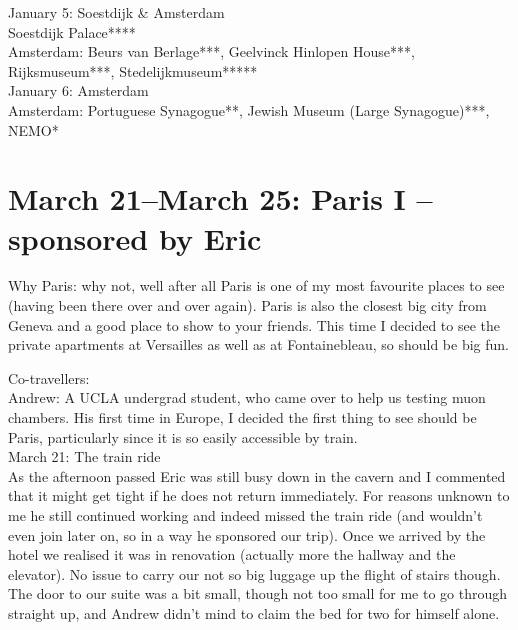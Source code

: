 January 5: Soestdijk \& Amsterdam\\
Soestdijk Palace****\\
Amsterdam: Beurs van Berlage***, Geelvinck Hinlopen House***, Rijksmuseum***, Stedelijkmuseum*****\\

January 6: Amsterdam\\
Amsterdam: Portuguese Synagogue**, Jewish Museum (Large Synagogue)***, NEMO*

\section{March 21--March 25: Paris I -- sponsored by Eric}
\label{2013:ParisI}

Why Paris: why not, well after all Paris is one of my most favourite places to see (having been there over and over again). Paris is also the closest big city from Geneva and a good place to show to your friends. This time I decided to see the private apartments at Versailles as well as at Fontainebleau, so should be big fun. 

Co-travellers:\\
Andrew: A UCLA undergrad student, who came over to help us testing muon chambers. His first time in Europe, I decided the first thing to see should be Paris, particularly since it is so easily accessible by train.\\

March 21: The train ride\\
As the afternoon passed Eric was still busy down in the cavern and I commented that it might get tight if he does not return immediately. For reasons unknown to me he still continued working and indeed missed the train ride (and wouldn't even join later on, so in a way he sponsored our trip). Once we arrived by the hotel we realised it was in renovation (actually more the hallway and the elevator). No issue to carry our not so big luggage up the flight of stairs though. The door to our suite was a bit small, though not too small for me to go through straight up, and Andrew didn't mind to claim the bed for two for himself alone.\\

